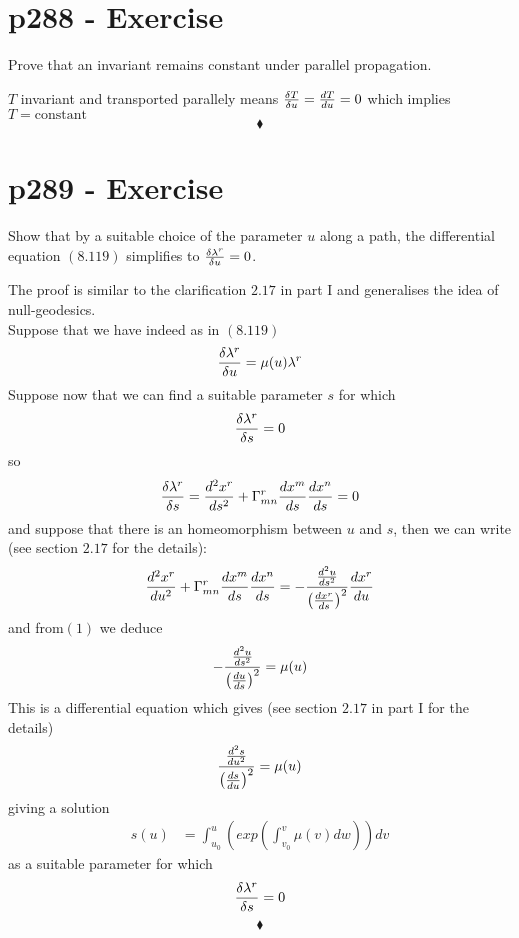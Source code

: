 \section{p288 - Exercise}
\begin{tcolorbox}
Prove that an invariant remains constant under parallel propagation.
\end{tcolorbox}
 $T$ invariant and transported parallely means $\fdv{T}{u}=\dv{T}{u}=0$ which implies $T=\text{constant}$
$$\blacklozenge$$
\newpage

\section{p289 - Exercise}
\begin{tcolorbox}
Show that by a suitable choice of the parameter $u$ along a path, the differential equation $\mathbf{(8.119)}$ simplifies to $\fdv{\lambda^r}{u}=0$.
\end{tcolorbox}
 The proof is similar to the clarification $2.17$ in part I and generalises the idea of null-geodesics.\\
 Suppose that we have indeed as in $\mathbf{(8.119)}$
 \begin{align}
 \fdv{\lambda^r}{u} = \mu(u)\lambda^r
 \end{align}
 Suppose now that we can find a suitable parameter $s$ for which
 \begin{align*}
 \fdv{\lambda^r}{s} = 0
 \end{align*}
 so 
 \begin{align*}
 \fdv{\lambda^r}{s} = \dv[2]{x^r}{s}+\Gamma^r_{mn}\dv{x^m}{s}\dv{x^n}{s}=0
 \end{align*}
 and suppose that there is an homeomorphism between $u$ and $s$, then we can write (see section $2.17$ for the details):
 \begin{align*}
\dv[2]{x^r}{u}+\Gamma^r_{mn}\dv{x^m}{s}\dv{x^n}{s}=- \frac{\dv[2]{u}{s}}{\left(\dv{x^r}{s}\right)^2}\dv{x^r}{u}
 \end{align*}
 and from$(1)$ we deduce 
 \begin{align*}
 -\frac{\dv[2]{u}{s}}{\left(\dv{u}{s}\right)^2}= \mu(u)
 \end{align*}
 This is a differential equation which gives (see section $2.17$ in part I for the details)
 \begin{align*}
 \frac{\dv[2]{s}{u}}{\left(\dv{s}{u}\right)^2}= \mu(u)
 \end{align*}
 giving a solution 
 \begin{align*}
 s(u)&= \int_{u_0}^{u}\left(exp\left(\int_{v_0}^v\mu(v)dw\right)\right)dv
 \end{align*}
 as a suitable parameter for which $$\fdv{\lambda^r}{s} = 0$$
$$\blacklozenge$$
\newpage



